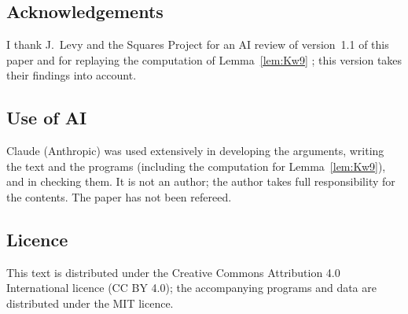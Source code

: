 \documentclass[11pt]{amsart}
\theoremstyle{definition}
\theoremstyle{remark}
\begin{document}
\subsection*{Acknowledgements}
I thank J.~Levy and the Squares Project for an AI review of version~1.1 of this paper and for replaying the computation of
Lemma~\ref{lem:Kw9} \cite{LevR}; this version takes their findings into account.

\subsection*{Use of AI}
Claude (Anthropic) was used extensively in developing the arguments, writing the text and the programs (including the
computation for Lemma~\ref{lem:Kw9}), and in checking them. It is not an author; the author takes full responsibility for the
contents. The paper has not been refereed.

\subsection*{Licence}
This text is distributed under the Creative Commons Attribution 4.0 International licence (CC BY 4.0); the accompanying programs and data are
distributed under the MIT licence.
\end{document}

